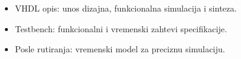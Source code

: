 \begin{frame}[label=07-s018]
\centering\par
\vspace{4mm}\raggedright
\begin{itemize}
\item VHDL opis: unos dizajna, funkcionalna simulacija i sinteza.
\item Testbench: funkcionalni i vremenski zahtevi specifikacije.
\item Posle rutiranja: vremenski model za preciznu simulaciju.
\end{itemize}
\end{frame}
